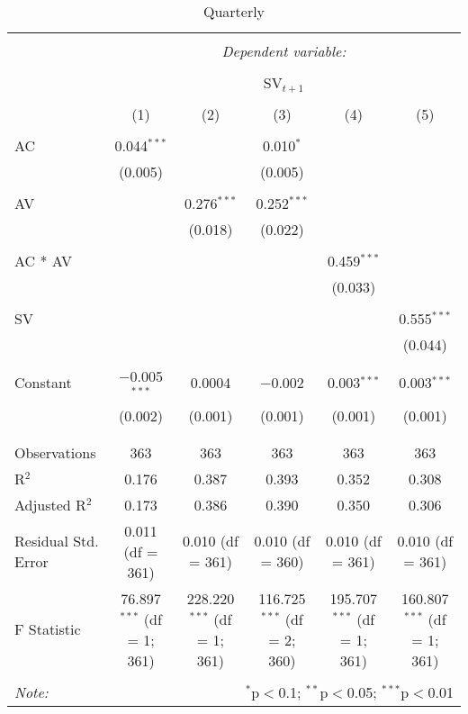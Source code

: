 
\begin{table}[!htbp] \centering 
  \caption{Quarterly} 
  \label{} 
\begin{adjustbox}{width=1\textwidth}
	\begin{tabular}{@{\extracolsep{5pt}}lccccc} 
\\[-1.8ex]\hline 
\hline \\[-1.8ex] 
 & \multicolumn{5}{c}{\textit{Dependent variable:}} \\ 
\cline{2-6} 
\\[-1.8ex] & \multicolumn{5}{c}{SV$_{t+1}$} \\ 
\\[-1.8ex] & (1) & (2) & (3) & (4) & (5)\\ 
\hline \\[-1.8ex] 
 AC & 0.044$^{***}$ &  & 0.010$^{*}$ &  &  \\ 
 & (0.005) &  & (0.005) &  &  \\ 
 & & & & & \\ 
 AV &  & 0.276$^{***}$ & 0.252$^{***}$ &  &  \\ 
 &  & (0.018) & (0.022) &  &  \\ 
 & & & & & \\ 
 AC * AV &  &  &  & 0.459$^{***}$ &  \\ 
 &  &  &  & (0.033) &  \\ 
 & & & & & \\ 
 SV &  &  &  &  & 0.555$^{***}$ \\ 
 &  &  &  &  & (0.044) \\ 
 & & & & & \\ 
 Constant & $-$0.005$^{***}$ & 0.0004 & $-$0.002 & 0.003$^{***}$ & 0.003$^{***}$ \\ 
 & (0.002) & (0.001) & (0.001) & (0.001) & (0.001) \\ 
 & & & & & \\ 
 \hline \\[-1.8ex] 
 Observations & 363 & 363 & 363 & 363 & 363 \\ 
 R$^{2}$ & 0.176 & 0.387 & 0.393 & 0.352 & 0.308 \\ 
 Adjusted R$^{2}$ & 0.173 & 0.386 & 0.390 & 0.350 & 0.306 \\ 
 Residual Std. Error & 0.011 (df = 361) & 0.010 (df = 361) & 0.010 (df = 360) & 0.010 (df = 361) & 0.010 (df = 361) \\ 
 F Statistic & 76.897$^{***}$ (df = 1; 361) & 228.220$^{***}$ (df = 1; 361) & 116.725$^{***}$ (df = 2; 360) & 195.707$^{***}$ (df = 1; 361) & 160.807$^{***}$ (df = 1; 361) \\ 
 \hline 
 \hline \\[-1.8ex] 
 \textit{Note:}  & \multicolumn{5}{r}{$^{*}$p$<$0.1; $^{**}$p$<$0.05; $^{***}$p$<$0.01} \\
\end{tabular}
\end{adjustbox} 
\end{table} 
